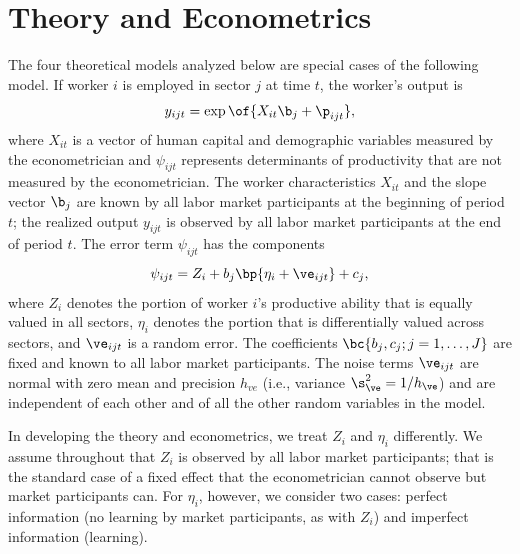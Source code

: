 \documentclass[12pt]{article}
\theoremstyle{definition}
\begin{document}
\section{Theory and Econometrics}

The four theoretical models analyzed below are special cases of the following model. If worker $i$ is employed in sector $j$ at time $t$, the worker's output is 
\begin{equation}
    \label{1}
    y_{ijt} = \exp\of{X_{it} \b_j + \p_{ijt}},
\end{equation}
where $X_{it}$ is a vector of human capital and demographic variables measured by the econometrician and $\psi_{ijt}$ represents determinants of productivity that are not measured by the econometrician. The worker characteristics $X_{it}$ and the slope vector $\b_j$ are known by all labor market participants at the beginning of period $t$; the realized output $y_{ijt}$ is observed by all labor market participants at the end of period $t$. The error term $\psi_{ijt}$ has the components
\begin{equation}
    \label{2}
    \psi_{ijt} = Z_i + b_j \bp{\eta_i + \ve_{ijt}} + c_j,
\end{equation}
where $Z_i$ denotes the portion of worker $i$'s productive ability that is equally valued in all sectors, $\eta_i$ denotes the portion that is differentially valued across sectors, and $\ve_{ijt}$ is a random error. The coefficients $\bc{b_j, c_j; j = 1, \ldots, J}$ are fixed and known to all labor market participants. The noise terms $\ve_{ijt}$ are normal with zero mean and precision $h_{ve}$ (i.e., variance $\s_{\ve}^2 = 1/h_\ve$) and are independent of each other and of all the other random variables in the model. 

In developing the theory and econometrics, we treat $Z_i$ and $\eta_i$ differently. We assume throughout that $Z_i$ is observed by all labor market participants; that is the standard case of a fixed effect that the econometrician cannot observe but market participants can. For $\eta_i$, however, we consider two cases: perfect information (no learning by market participants, as with $Z_i$) and imperfect information (learning). 
\end{document}
